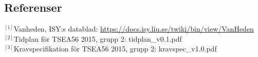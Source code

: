 \documentclass[11pt]{article}
\begin{document}
\begin{flushleft}
\setcounter{secnumdepth}{0}
\pagebreak
\section{Referenser}


$^{[1]}$Vanheden, ISY:s datablad: \url{https://docs.isy.liu.se/twiki/bin/view/VanHeden} \\[0.1in]

$^{[2]}$Tidplan för TSEA56 2015, grupp 2: tidplan\_v0.1.pdf \\[0.1in]

$^{[3]}$Kravspecifikation för TSEA56 2015, grupp 2: kravspec\_v1.0.pdf \\[0.1in]

\setcounter{secnumdepth}{2}


\end{flushleft}
\end{document}
